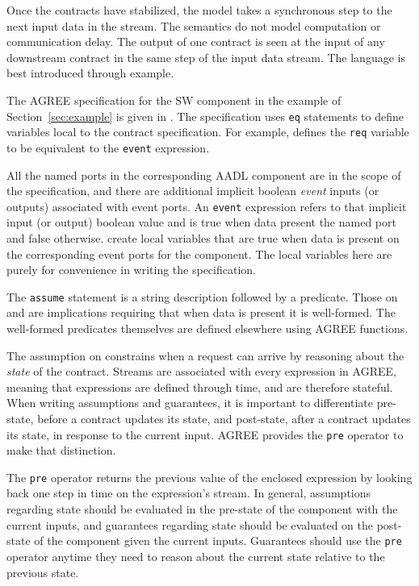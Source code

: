 Once the contracts have stabilized, the model takes a synchronous step to the next input data in the stream.
The semantics do not model computation or communication delay.
The output of one contract is seen at the input of any downstream contract in the same step of the input data stream.
The language is best introduced through example.

The AGREE specification for the SW component in the example of Section~\ref{sec:example} is given in .
The specification uses \texttt{eq} statements to define variables local to the contract specification.
For example,  defines the \texttt{req} variable to be equivalent to the \texttt{event} expression.

All the named ports in the corresponding AADL component are in the scope of the specification, and there are additional implicit boolean \emph{event} inputs (or outputs) associated with event ports.
An \texttt{event} expression refers to that implicit input (or output) boolean value and is true when data present the named port and false otherwise.
 create local variables that are true when data is present on the corresponding event ports for the component.
The local variables here are purely for convenience in writing the specification.

The \texttt{assume} statement is a string description followed by a predicate.
Those on  and  are implications requiring that when data is present it is well-formed.
The well-formed predicates themselves are defined elsewhere using AGREE functions.

The assumption on  constrains when a request can arrive by reasoning about the \emph{state} of the contract.
Streams are associated with every expression in AGREE, meaning that expressions are defined through time, and are therefore stateful.
When writing assumptions and guarantees, it is important to differentiate pre-state, before a contract updates its state, and post-state, after a contract updates its state, in response to the current input. AGREE provides the \texttt{pre} operator to make that distinction.

The \texttt{pre} operator returns the previous value of the enclosed expression by looking back one step in time on the expression's stream.
In general, assumptions regarding state should be evaluated in the pre-state of the component with the current inputs, and guarantees regarding state should be evaluated on the post-state of the component given the current inputs.
Guarantees should use the \texttt{pre} operator anytime they need to reason about the current state relative to the previous state. 

